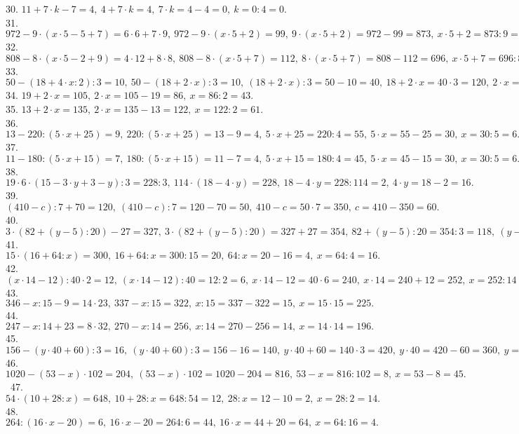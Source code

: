 30. $11+7\cdot k-7=4,\ 4+7\cdot k=4,\ 7\cdot k =4-4=0,\ k=0:4=0.$\\
31. $972-9\cdot(x\cdot 5-5+7)=6\cdot6+7\cdot9,\ 972-9\cdot(x\cdot 5+2)=99,\ 9\cdot(x\cdot 5+2)=972-99=873,\ x\cdot 5+2=873:9=97,\ x\cdot 5=97-2=95,\ x=95:5=19.$\\
32. $808-8\cdot(x\cdot5-2+9)=4\cdot12+8\cdot8,\ 808-8\cdot(x\cdot5+7)=112,\ 8\cdot(x\cdot5+7)=808-112=696,\ x\cdot5+7=696:8=87,\ x\cdot5=87-7=80,\ x=80:5=16.$\\
33. $50-(18+4\cdot x:2):3=10,\ 50-(18+2\cdot x):3=10,\ (18+2\cdot x):3=50-10=40,\ 18+2\cdot x=40\cdot3=120,\ 2\cdot x=120-18=102,\ x=102:2=51.$\\
34. $19+2\cdot x=105,\ 2\cdot x=105-19=86,\ x=86:2=43.$\\
35. $13+2\cdot x=135,\ 2\cdot x=135-13=122,\ x=122:2=61.$\\
36. $13-220:(5\cdot x+25)=9,\ 220:(5\cdot x+25)=13-9=4,\ 5\cdot x+25=220:4=55,\ 5\cdot x=55-25=30,\ x=30:5=6.$\\
37. $11-180:(5\cdot x+15)=7,\ 180:(5\cdot x+15)=11-7=4,\ 5\cdot x+15=180:4=45,\ 5\cdot x =45-15=30,\ x=30:5=6.$\\
38. $19\cdot6\cdot(15-3\cdot y+3-y):3=228:3,\ 114\cdot(18-4\cdot y)=228,\ 18-4\cdot y=228:114=2,\ 4\cdot y=18-2=16.$\\
39. $(410-c):7+70=120,\ (410-c):7=120-70=50,\ 410-c=50\cdot7=350,\ c=410-350=60.$\\
40. $3\cdot(82+(y-5):20)-27=327,\ 3\cdot(82+(y-5):20)=327+27=354,\ 82+(y-5):20=354:3=118,\ (y-5):20=118-82=36,\ y-5=36\cdot20=720,\ y=720+5=725.$\\
41. $15\cdot(16+64:x)=300,\ 16+64:x=300:15=20,\ 64:x=20-16=4,\ x=64:4=16.$\\
42. $(x\cdot14-12):40\cdot2=12,\ (x\cdot14-12):40=12:2=6,\ x\cdot14-12=40\cdot6=240,\ x\cdot14=240+12=252,\ x=252:14=18.$\\
43. $346-x:15-9=14\cdot23,\ 337-x:15=322,\ x:15=337-322=15,\ x=15\cdot15=225.$\\
44. $247-x:14+23=8\cdot32,\ 270-x:14=256,\ x:14=270-256=14,\ x=14\cdot14=196.$\\
45. $156-(y\cdot40+60):3=16,\ (y\cdot40+60):3=156-16=140,\ y\cdot40+60=140\cdot3=420,\ y\cdot40=420-60=360,\ y=360:40=9.$\\
46. $1020-(53-x)\cdot102=204,\ (53-x)\cdot102=1020-204=816,\ 53-x=816:102=8,\ x=53-8=45.$\
47. $54\cdot(10+28:x)=648,\ 10+28:x=648:54=12,\ 28:x=12-10=2,\ x=28:2=14.$\\
48. $264:(16\cdot x-20)=6,\ 16\cdot x-20=264:6=44,\ 16\cdot x=44+20=64,\ x=64:16=4.$\\
